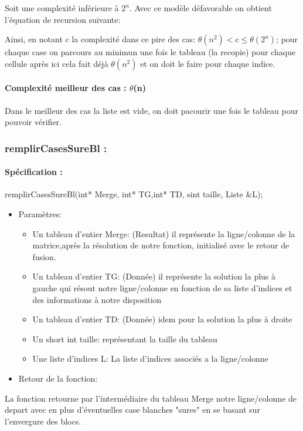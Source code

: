 \documentclass{article}
\begin{document}
Soit une complexité inférieure à $2^n$.
\newline
Avec ce modèle défavorable on obtient l'équation de recursion suivante:
\begin{center}
\end{center}
Ainsi, en notant c la complexité dans ce pire des cas: $\theta(n^2) <$c$\leq\theta(2^n)$; pour chaque case on parcours au minimun une fois le tableau (la recopie) pour chaque cellule après ici cela fait déjà $\theta(n^2)$ et on doit le faire pour chaque indice.
\paragraph{Complexité meilleur des cas : $\theta$(n)\newline}
Dans le meilleur des cas la liste est vide, on doit pacourir une fois le tableau pour pouvoir vérifier.
\subsubsection{remplirCasesSureBl :}
\paragraph{Spécification :}remplirCasesSureBl(int* Merge, int* TG,int* TD, sint taille, Liste \&L);
\begin{itemize}
\item Paramètres:
\begin{itemize}
\item Un tableau d'entier Merge: (Resultat) il représente la ligne/colonne de la matrice,après la résolution de notre fonction, initialisé avec le retour de fusion.
\item Un tableau d'entier TG: (Donnée) il représente la solution la plus à gauche qui résout notre ligne/colonne en fonction de sa liste d'indices et des informations à notre disposition
\item Un tableau d'entier TD: (Donnée) idem pour la solution la plus à droite
\item Un short int taille: représentant la taille du tableau
\item Une liste d'indices L: La liste d'indices associés a la ligne/colonne
\end{itemize}
\item Retour de la fonction:
\end{itemize}
La fonction retourne par l'intermédiaire du tableau Merge notre ligne/colonne de depart avec en plus d'éventuelles case blanches "sures" en se basant sur l'envergure des blocs.
\end{document}
